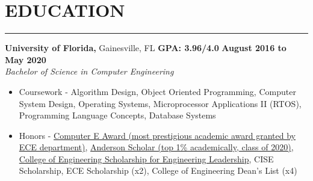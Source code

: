 \section*{EDUCATION}

\hrule \relax
\sectionheaderspace

\noindent \textbf{University of Florida,} Gainesville, FL
\hfill\textbf{GPA: 3.96/4.0}
\hfill\textbf{August 2016 to May 2020}\\
\textit{Bachelor of Science in Computer Engineering}
\begin{itemize}[noitemsep,nolistsep, label = {-}]
	\item  Coursework - 
		Algorithm Design,
		Object Oriented Programming,
		Computer System Design,
		Operating Systems,
		Microprocessor Applications II (RTOS),
		Programming Language Concepts,
		Database Systems
	\item  Honors - 
		\href{https://www.ece.ufl.edu/people/student-awards/}
				{Computer E Award (most prestigious academic award granted by ECE department)},
		\href{https://sites.clas.ufl.edu/clas-main/undergraduate/anderson-scholars/anderson-scholars-listing/}
				{Anderson Scholar (top 1\% academically, class of 2020)},
		\href{https://www.eng.ufl.edu/leadership/students/scholarships/thomas-o-hunter-leadership/}
				{College of Engineering Scholarship for Engineering Leadership},
		CISE Scholarship,
		ECE Scholarship (x2),
		College of Engineering Dean\rq s List (x4)
\end{itemize}
\subsectionspace